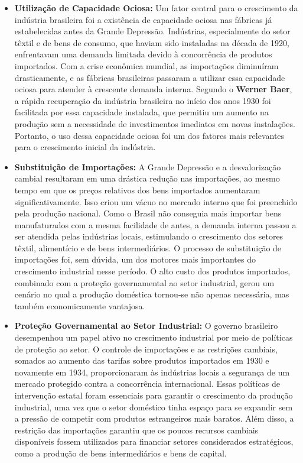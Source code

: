 \documentclass[a4paper,12pt]{article}[abntex2]
\begin{document}
\begin{itemize}
    \item \textbf{Utilização de Capacidade Ociosa:} 
    Um fator central para o crescimento da indústria brasileira foi a existência de capacidade ociosa nas fábricas já estabelecidas antes da Grande Depressão. Indústrias, especialmente do setor têxtil e de bens de consumo, que haviam sido instaladas na década de 1920, enfrentavam uma demanda limitada devido à concorrência de produtos importados. Com a crise econômica mundial, as importações diminuíram drasticamente, e as fábricas brasileiras passaram a utilizar essa capacidade ociosa para atender à crescente demanda interna. Segundo o \textbf{Werner Baer}, a rápida recuperação da indústria brasileira no início dos anos 1930 foi facilitada por essa capacidade instalada, que permitiu um aumento na produção sem a necessidade de investimentos imediatos em novas instalações. Portanto, o uso dessa capacidade ociosa foi um dos fatores mais relevantes para o crescimento inicial da indústria.

    \item \textbf{Substituição de Importações:} 
    A Grande Depressão e a desvalorização cambial resultaram em uma drástica redução nas importações, ao mesmo tempo em que os preços relativos dos bens importados aumentaram significativamente. Isso criou um vácuo no mercado interno que foi preenchido pela produção nacional. Como o Brasil não conseguia mais importar bens manufaturados com a mesma facilidade de antes, a demanda interna passou a ser atendida pelas indústrias locais, estimulando o crescimento dos setores têxtil, alimentício e de bens intermediários. O processo de substituição de importações foi, sem dúvida, um dos motores mais importantes do crescimento industrial nesse período. O alto custo dos produtos importados, combinado com a proteção governamental ao setor industrial, gerou um cenário no qual a produção doméstica tornou-se não apenas necessária, mas também economicamente vantajosa.

    \item \textbf{Proteção Governamental ao Setor Industrial:} 
    O governo brasileiro desempenhou um papel ativo no crescimento industrial por meio de políticas de proteção ao setor. O controle de importações e as restrições cambiais, somados ao aumento das tarifas sobre produtos importados em 1930 e novamente em 1934, proporcionaram às indústrias locais a segurança de um mercado protegido contra a concorrência internacional. Essas políticas de intervenção estatal foram essenciais para garantir o crescimento da produção industrial, uma vez que o setor doméstico tinha espaço para se expandir sem a pressão de competir com produtos estrangeiros mais baratos. Além disso, a restrição das importações garantiu que os poucos recursos cambiais disponíveis fossem utilizados para financiar setores considerados estratégicos, como a produção de bens intermediários e bens de capital.


\end{itemize}
\end{document}
